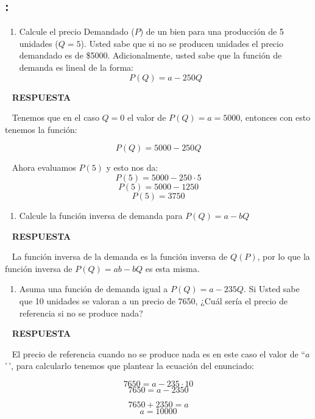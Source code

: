 \documentclass[
  letterpaper,
  DIV=11,
  numbers=noendperiod]{scrreport}
\providecommand{\tightlist}{%
  \setlength{\itemsep}{0pt}\setlength{\parskip}{0pt}}\usepackage{longtable,booktabs,array}
\begin{document}
\hypertarget{section-25}{%
\subsection{:}\label{section-25}}

\begin{enumerate}
\def\labelenumi{\arabic{enumi})}
\tightlist
\item
  Calcule el precio Demandado (\(P\)) de un bien para una producción de
  5 unidades (\(Q=5\)). Usted sabe que si no se producen unidades el
  precio demandado es de \$5000. Adicionalmente, usted sabe que la
  función de demanda es lineal de la forma: \[P(Q)=a-250Q\]
\end{enumerate}

~ \textbf{RESPUESTA}

~ Tenemos que en el caso \(Q=0\) el valor de \(P(Q)=a=5000\), entonces
con esto tenemos la función:

\[
P(Q)=5000-250Q
\]

~ Ahora evaluamos \(P(5)\) y esto nos da: \[
P(5)=5000-250\cdot 5
\] \[
P(5)=5000-1250
\] \[
P(5)=3750
\]

\begin{enumerate}
\def\labelenumi{\arabic{enumi})}
\setcounter{enumi}{1}
\tightlist
\item
  Calcule la función inversa de demanda para \(P(Q)=a-bQ\)
\end{enumerate}

~ \textbf{RESPUESTA}

~ La función inversa de la demanda es la función inversa de \(Q(P)\),
por lo que la función inversa de \(P(Q)=ab-bQ\) es esta misma.

\begin{enumerate}
\def\labelenumi{\arabic{enumi})}
\setcounter{enumi}{2}
\tightlist
\item
  Asuma una función de demanda igual a \(P(Q)=a-235Q\). Si Usted sabe
  que 10 unidades se valoran a un precio de 7650, ¿Cuál sería el precio
  de referencia si no se produce nada?
\end{enumerate}

~ \textbf{RESPUESTA}

~ El precio de referencia cuando no se produce nada es en este caso el
valor de ``\(a\)'\,', para calcularlo tenemos que plantear la ecuación
del enunciado:

\[
7650=a-235\cdot 10
\] \[
7650=a-2350
\]

\[
7650+2350=a
\] \[
a=10000
\]
\end{document}
